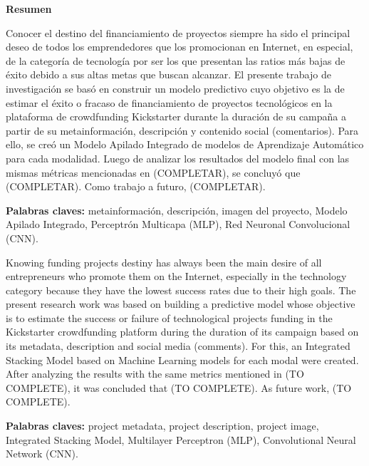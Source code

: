 \thispagestyle{plain}
\begin{center}
	{\Large \bfseries  Resumen}
\end{center}
\vspace{0.5cm}

Conocer el destino del financiamiento de proyectos siempre ha sido el principal deseo de todos los emprendedores que los promocionan en Internet, en especial, de la categoría de tecnología por ser los que presentan las ratios más bajas de éxito debido a sus altas metas que buscan alcanzar. El presente trabajo de investigación se basó en construir un modelo predictivo cuyo objetivo es la de estimar el éxito o fracaso de financiamiento de proyectos tecnológicos en la plataforma de crowdfunding Kickstarter durante la duración de su campaña a partir de su metainformación, descripción y contenido social (comentarios). Para ello, se creó un Modelo Apilado Integrado de modelos de Aprendizaje Automático para cada modalidad. Luego de analizar los resultados del modelo final con las mismas métricas mencionadas en (COMPLETAR), se concluyó que (COMPLETAR). Como trabajo a futuro, (COMPLETAR).

\textbf{Palabras claves: } metainformación, descripción, imagen del proyecto, Modelo Apilado Integrado, Perceptrón Multicapa (MLP), Red Neuronal Convolucional (CNN).

\vspace{0.5cm}
Knowing funding projects destiny has always been the main desire of all entrepreneurs who promote them on the Internet, especially in the technology category because they have the lowest success rates due to their high goals. The present research work was based on building a predictive model whose objective is to estimate the success or failure of technological projects funding in the Kickstarter crowdfunding platform during the duration of its campaign based on its metadata, description and social media (comments). For this, an Integrated Stacking Model based on Machine Learning models for each modal were created. After analyzing the results with the same metrics mentioned in (TO COMPLETE), it was concluded that (TO COMPLETE). As future work, (TO COMPLETE).

\textbf{Palabras claves: } project metadata, project description, project image, Integrated Stacking Model, Multilayer Perceptron (MLP), Convolutional Neural Network (CNN).